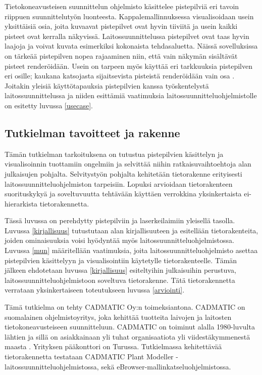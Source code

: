 Tietokoneavusteisen suunnittelun ohjelmisto käsittelee pistepilviä eri tavoin riippuen suunnittelutyön luonteesta. Kappalemallinnuksessa visualisoidaan usein yksittäisiä osia, joita kuvaavat pistepilvet ovat hyvin tiiviitä ja usein kaikki pisteet ovat kerralla näkyvissä. Laitossuunnittelussa pistepilvet ovat taas hyvin laajoja ja voivat kuvata esimerkiksi kokonaista tehdasaluetta. Näissä sovelluksissa on tärkeää pistepilven nopea rajaaminen niin, että vain näkymän sisältävät pisteet renderöidään. Usein on tarpeen myös käyttää eri tarkkuuksia pistepilven eri osille; kaukana katsojasta sijaitsevista pisteistä renderöidään vain osa \cite{mikko}. Joitakin yleisiä käyttötapauksia pistepilvien kanssa työskentelystä laitossuunnittelussa ja niiden esittämiä vaatimuksia laitossuunnitteluohjelmistolle on esitetty luvussa \ref{usecase}.


\subsection{Tutkielman tavoitteet ja rakenne}

Tämän tutkielman tarkoituksena on tutustua pistepilvien käsittelyn ja visualisoinnin tuottamiin ongelmiin ja selvittää niihin ratkaisuvaihtoehtoja alan julkaisujen pohjalta. Selvitystyön pohjalta kehitetään tietorakenne erityisesti laitossuunnitteluohjelmiston tarpeisiin. Lopuksi arvioidaan tietorakenteen suorituskykyä ja soveltuvuutta tehtävään käyttäen verrokkina yksinkertaista ei-hierarkista tietorakennetta.

Tässä luvussa on perehdytty pistepilviin ja laserkeilaimiin yleisellä tasolla. Luvussa \ref{kirjallisuus} tutustutaan alan kirjallisuuteen ja esitellään tietorakenteita, joiden ominaisuuksia voisi hyödyntää myös laitossuunnitteluohjelmistossa. Luvussa \ref{mun} määritellään vaatimuksia, joita laitossuunnitteluohjelmisto asettaa pistepilvien käsittelyyn ja visualisointiin käytetylle tietorakenteelle. Tämän jälkeen ehdotetaan luvussa \ref{kirjallisuus} esiteltyihin julkaisuihin perustuva, laitossuunnitteluohjelmistoon soveltuva tietorakenne. Tätä tietorakennetta verrataan yksinkertaiseen toteutukseen luvussa \ref{arviointi}.

Tämä tutkielma on tehty CADMATIC Oy:n toimeksiantona. CADMATIC on suomalainen ohjelmistoyritys, joka kehittää tuotteita laivojen ja laitosten tietokoneavusteiseen suunnitteluun. CADMATIC on toiminut alalla 1980-luvulta lähtien ja sillä on asiakkainaan yli tuhat organisaatiota yli viidestäkymmenestä maasta \cite{cadmatic}. Yrityksen pääkonttori on Turussa. Tutkielmassa kehitettävää tietorakennetta testataan CADMATIC Plant Modeller -laitossuunnitteluohjelmistossa, sekä eBrowser-mallinkatseluohjelmistossa. 